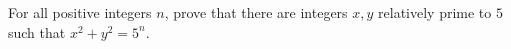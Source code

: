 For all positive integers $n$, prove that there are integers $x, y$ relatively prime to $5$ such that $x^2 + y^2 = 5^n$.